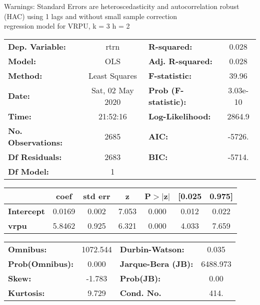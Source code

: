 Warnings: \newline
 [1] Standard Errors are heteroscedasticity and autocorrelation robust (HAC) using 1 lags and without small sample correction\\ 

regression model for VRPU, k = 3 h = 2\begin{center}
\begin{tabular}{lclc}
\toprule
\textbf{Dep. Variable:}    &       rtrn       & \textbf{  R-squared:         } &     0.028   \\
\textbf{Model:}            &       OLS        & \textbf{  Adj. R-squared:    } &     0.028   \\
\textbf{Method:}           &  Least Squares   & \textbf{  F-statistic:       } &     39.96   \\
\textbf{Date:}             & Sat, 02 May 2020 & \textbf{  Prob (F-statistic):} &  3.03e-10   \\
\textbf{Time:}             &     21:52:16     & \textbf{  Log-Likelihood:    } &    2864.9   \\
\textbf{No. Observations:} &        2685      & \textbf{  AIC:               } &    -5726.   \\
\textbf{Df Residuals:}     &        2683      & \textbf{  BIC:               } &    -5714.   \\
\textbf{Df Model:}         &           1      & \textbf{                     } &             \\
\bottomrule
\end{tabular}
\begin{tabular}{lcccccc}
                   & \textbf{coef} & \textbf{std err} & \textbf{z} & \textbf{P$> |$z$|$} & \textbf{[0.025} & \textbf{0.975]}  \\
\midrule
\textbf{Intercept} &       0.0169  &        0.002     &     7.053  &         0.000        &        0.012    &        0.022     \\
\textbf{vrpu}      &       5.8462  &        0.925     &     6.321  &         0.000        &        4.033    &        7.659     \\
\bottomrule
\end{tabular}
\begin{tabular}{lclc}
\textbf{Omnibus:}       & 1072.544 & \textbf{  Durbin-Watson:     } &    0.035  \\
\textbf{Prob(Omnibus):} &   0.000  & \textbf{  Jarque-Bera (JB):  } & 6488.973  \\
\textbf{Skew:}          &  -1.783  & \textbf{  Prob(JB):          } &     0.00  \\
\textbf{Kurtosis:}      &   9.729  & \textbf{  Cond. No.          } &     414.  \\
\bottomrule
\end{tabular}
\end{center}

